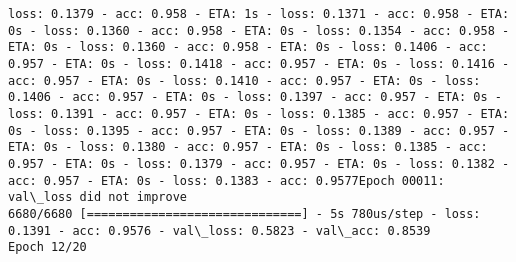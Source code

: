 \documentclass[11pt]{article}
\begin{document}
\begin{Verbatim}[commandchars=\\\{\}]
loss: 0.1379 - acc: 0.958 - ETA: 1s - loss: 0.1371 - acc: 0.958 - ETA: 0s - loss: 0.1360 - acc: 0.958 - ETA: 0s - loss: 0.1354 - acc: 0.958 - ETA: 0s - loss: 0.1360 - acc: 0.958 - ETA: 0s - loss: 0.1406 - acc: 0.957 - ETA: 0s - loss: 0.1418 - acc: 0.957 - ETA: 0s - loss: 0.1416 - acc: 0.957 - ETA: 0s - loss: 0.1410 - acc: 0.957 - ETA: 0s - loss: 0.1406 - acc: 0.957 - ETA: 0s - loss: 0.1397 - acc: 0.957 - ETA: 0s - loss: 0.1391 - acc: 0.957 - ETA: 0s - loss: 0.1385 - acc: 0.957 - ETA: 0s - loss: 0.1395 - acc: 0.957 - ETA: 0s - loss: 0.1389 - acc: 0.957 - ETA: 0s - loss: 0.1380 - acc: 0.957 - ETA: 0s - loss: 0.1385 - acc: 0.957 - ETA: 0s - loss: 0.1379 - acc: 0.957 - ETA: 0s - loss: 0.1382 - acc: 0.957 - ETA: 0s - loss: 0.1383 - acc: 0.9577Epoch 00011: val\_loss did not improve
6680/6680 [==============================] - 5s 780us/step - loss: 0.1391 - acc: 0.9576 - val\_loss: 0.5823 - val\_acc: 0.8539
Epoch 12/20

\end{Verbatim}
\end{document}
